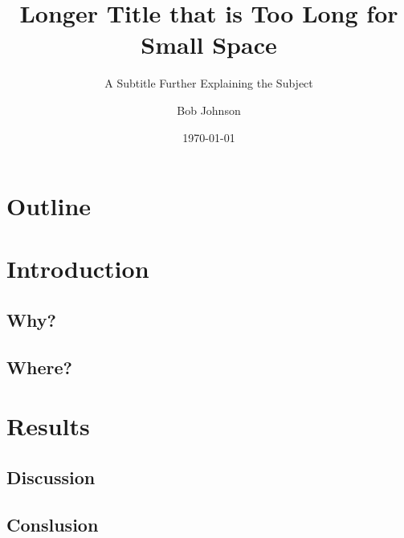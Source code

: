 \documentclass[11pt, a4paper]{beamer}
\title[Short Tile]{Longer Title that is Too Long for Small Space}
\subtitle{A Subtitle Further Explaining the Subject}
\author[Short Author Name]{Bob Johnson}
\institute[Short Institute]{University of Templates}
\date[Short Date]{\today} %
\begin{document}
\frame{\titlepage}


\section*{Outline}
\frame{\tableofcontents}

\section{Introduction}
\frame{\tableofcontents[currentsection]}

\subsection{Why?}
\begin{frame}

\end{frame}

\subsection{Where?}
\begin{frame}

\end{frame}


\section{Results}
\frame{\tableofcontents[currentsection]}

\subsection{Discussion}
\begin{frame}

\end{frame}

\subsection{Conslusion}
\begin{frame}

\end{frame}



% 
\end{document}
